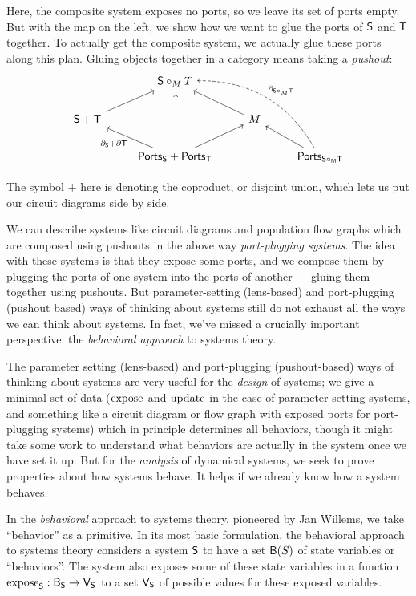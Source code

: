 \documentclass[DynamicalBook]{subfiles}
\begin{document}
Here, the composite system exposes no ports, so we leave its set of ports empty.
But with the map on the left, we show how we want to glue the ports of $\mathsf{S}$
and $\mathsf{T}$ together. To actually get the composite system, we actually glue
these ports along this plan. Gluing objects together in a category means taking
a \emph{pushout}:
\[
\begin{tikzcd}
	& {\Sys{S} \circ_M T} \\
	{\Sys{S} + \Sys{T}} && M \\
	& {\Ports{S} + \Ports{T}} && {\Ports{S \circ_M T}}
	\arrow["{\partial_{\Sys{S}} + \partial{\Sys{T}}}", from=3-2, to=2-1]
	\arrow[from=3-2, to=2-3]
	\arrow[from=3-4, to=2-3]
	\arrow[from=2-3, to=1-2]
	\arrow[from=2-1, to=1-2]
	\arrow["\ulcorner"{anchor=center, pos=0.125, rotate=-45}, draw=none, from=1-2, to=3-2]
	\arrow["{\partial_{\Sys{S} \circ_{M} \Sys{T}}}"', bend right = 30, dashed, from=3-4, to=1-2]
\end{tikzcd}
\]

The symbol $+$ here is denoting the coproduct, or disjoint union, which lets us
put our circuit diagrams side by side.

We can describe systems like circuit diagrams and population flow graphs which
are composed using pushouts in the above way \emph{port-plugging
  systems}. The idea with these systems is that they expose some ports, and we
compose them by plugging the ports of one system into the ports of another ---
gluing them together using pushouts. But parameter-setting (lens-based) and
port-plugging (pushout based) ways of thinking about systems still do not exhaust all the ways we can
think about systems. In fact, we've missed a crucially important perspective:
the \emph{behavioral approach} to systems theory.

The parameter setting (lens-based) and port-plugging (pushout-based) ways of thinking about systems are very useful for the \emph{design} of systems; we give
a minimal set of data ($\mathrm{expose}_{\mathsf{}}$ and $\mathrm{update}_{\mathsf{}}$ in the case of parameter
setting systems, and something like a circuit diagram or flow graph with exposed
ports for port-plugging systems) which in principle determines all behaviors, though it
might take some work to understand what behaviors are actually in the system
once we have set it up. But for the \emph{analysis} of dynamical systems, we
seek to prove properties about how systems behave. It helps if we
already know how a system behaves.

In the \emph{behavioral} approach to systems theory, pioneered by Jan Willems,
we take ``behavior'' as a primitive. In its most basic formulation, the behavioral
approach to systems theory considers a system $\mathsf{S}$ to have a set
$\mathsf{B}(S)$ of state variables or ``behaviors''. The system also exposes some of these
state variables in a function $\mathrm{expose}_{\mathsf{S}} : \mathsf{B}_{\mathsf{S}} \to \mathsf{V}_{\mathsf{S}}$
to a set
$\mathsf{V}_{\mathsf{S}}$ of possible values for these exposed variables.
\end{document}
